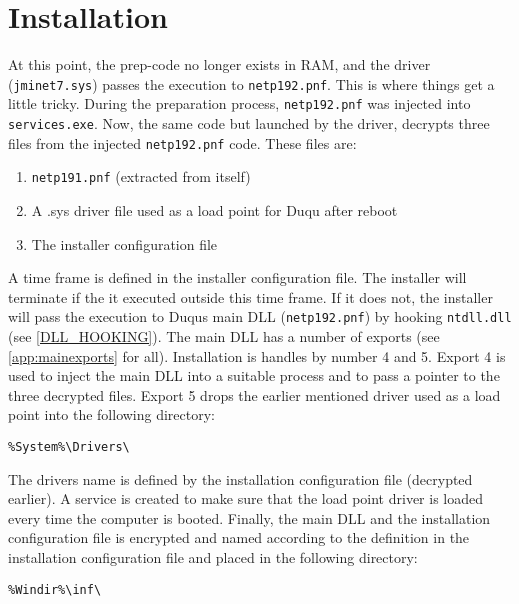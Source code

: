 \documentclass[11pt,english,a4paper]{report}
\begin{document}
\section{Installation}
At this point, the prep-code no longer exists in RAM, and the driver (\texttt{jminet7.sys}) passes the execution to \texttt{netp192.pnf}. This is where things get a little tricky. During the preparation process, \texttt{netp192.pnf} was injected into \texttt{services.exe}. Now, the same code but launched by the driver, decrypts three files from the injected \texttt{netp192.pnf} code. These files are:
 \begin{enumerate}
   \item \texttt{netp191.pnf} (extracted from itself)
   \item A .sys driver file used as a load point for Duqu after reboot
   \item The installer configuration file
  \end{enumerate}
A time frame is defined in the installer configuration file. The installer will terminate if the it executed outside this time frame. If it does not, the installer will pass the execution to Duqus main DLL (\texttt{netp192.pnf}) by hooking \texttt{ntdll.dll} (see \ref{DLL_HOOKING}). The main DLL has a number of exports (see \ref{app:mainexports} for all). Installation is handles by number 4 and 5. Export 4 is used to inject the main DLL into a suitable process and to pass a pointer to the three decrypted files. Export 5 drops the earlier mentioned driver used as a load point into the following directory:
\begin{lstlisting}
%System%\Drivers\ 
\end{lstlisting}
The drivers name is defined by the installation configuration file (decrypted earlier). A service is created to make sure that the load point driver is loaded every time the computer is booted. Finally, the main DLL and the installation configuration file is encrypted and named according to the definition in the installation configuration file and placed in the following directory:
\begin{lstlisting}
%Windir%\inf\ 
\end{lstlisting}
\end{document}

